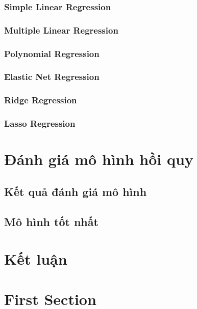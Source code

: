 \documentclass[runningheads]{llncs}
\begin{document}
\subsubsection{Simple Linear Regression}
\subsubsection{Multiple Linear Regression}
\subsubsection{Polynomial Regression}
\subsubsection{Elastic Net Regression}
\subsubsection{Ridge Regression}
\subsubsection{Lasso Regression}


\section{Đánh giá mô hình hồi quy}

\subsection{Kết quả đánh giá mô hình}

\subsection{Mô hình tốt nhất}

\section{Kết luận}

\begin{thebibliography}{5}

\end{thebibliography}
\pagebreak
\section{First Section}
\end{document}
